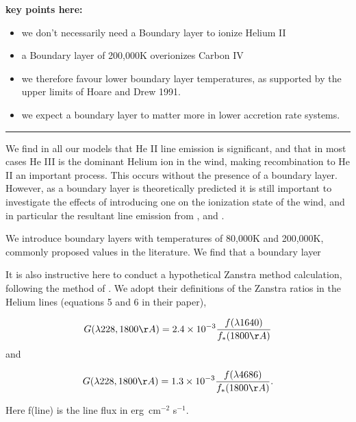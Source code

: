 \documentclass[preprint, a4paper, 11pt]{aastex}
\begin{document}
{\bf 
\noindent key points here:

\begin{itemize}
	\item we don't necessarily need a Boundary layer to ionize Helium II
	\item a Boundary layer of 200,000K overionizes Carbon IV
	\item we therefore favour lower boundary layer temperatures, as supported
	by the upper limits of Hoare and Drew 1991.
	\item we expect a boundary layer to matter more in lower accretion
	rate systems.
\end{itemize}
}

\noindent\rule{16cm}{0.4pt}

We find in all our models that He II line emission is significant, and that 
in most cases He  III is the dominant Helium ion in the wind, making recombination
to He II an important process. This occurs without the presence of a boundary 
layer. However, as a boundary layer is theoretically predicted 
it is still important to investigate the effects of introducing
one on the ionization state of the wind, and in particular
the resultant line emission from \heiiuv, \heiiuv and \civ. 

We introduce boundary layers with temperatures of 80,000K and 200,000K,
commonly proposed values in the literature. We find that a boundary layer


It is also instructive here to conduct a hypothetical 
Zanstra method calculation, following the method of \cite{hoare1991}. 
We adopt their definitions of the Zanstra ratios in the Helium lines (equations 5 and 6 
in their paper),


\begin{equation}
G (\lambda228, 1800 \AA) = 2.4\times 10^{-3} \frac{f(\lambda1640)}{f_*(1800\AA)}
\end{equation}
and

\begin{equation}
G (\lambda228, 1800 \AA) = 1.3\times 10^{-3} \frac{f(\lambda4686)}{f_*(1800\AA)}.\\
\end{equation}

Here f(line) is the line flux in erg~cm$^{-2}$ s$^{-1}$. 



\end{document}
